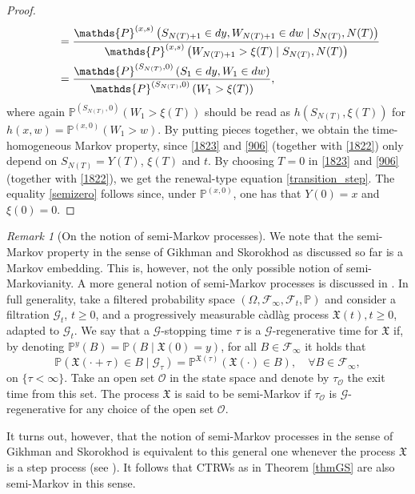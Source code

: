 \documentclass[reqno]{amsart}
\theoremstyle{remark}
\newtheorem{remark}[theorem]{Remark}
\numberwithin{equation}{section} %
\newcommand{\1}{\mathds{1}}
\begin{document}
\begin{proof}
\begin{align}
			&\qquad=\frac{\mathds{P}^{(x,s)} \left( S_{N(T)+1} \in dy, W_{N(T)+1} \in dw \mid S_{N(T)},  N(T) \right)}{\mathds{P}^{(x,s)}\left( W_{N(T)+1} > \xi(T) \mid  S_{N(T)},N(T) \right)} \notag \\
			&\qquad=\frac{\mathds{P}^{(S_{N(T)},0)} \left( S_{1} \in dy, W_{1} \in dw  \right)}{\mathds{P}^{(S_{N(T)},0)}\left( W_{1} > \xi(T) \right)},
			\label{1822}
		\end{align}
		where again $\mathds{P}^{(S_{N(T)},0)}\left( W_{1} > \xi(T) \right)$ should be read as $h(S_{N(T)},\xi(T))$ for $h(x,w)=\mathds{P}^{(x,0)}\left( W_{1} > w \right)$. By putting pieces together, we obtain the time-homogeneous Markov property, since \eqref{1823} and \eqref{906} (together with \eqref{1822}) only depend on $S_{N(T)}=Y(T)$, $\xi(T)$ and $t$. By choosing $T=0$ in \eqref{1823} and \eqref{906} (together with \eqref{1822}), we get the renewal-type equation \eqref{transition_step}. 
		The equality \eqref{semizero} follows since, under $\mathds{P}^{(x,0)}$, one has that $Y(0)=x$ and $\xi(0)=0$.
	\end{proof}
	\begin{remark}[On the notion of semi-Markov processes]
		We note that the semi-Markov property in the sense of Gikhman and Skorokhod as discussed so far is a Markov embedding. This is, however, not the only possible notion of semi-Markovianity. A more general notion of semi-Markov processes is discussed in \cite[Chapter 3]{harlamov}. In full generality, take a filtered probability space $(\Omega, \mathcal{F}_\infty, \mathcal{F}_t, \mathds{P})$ and consider a filtration $\mathcal{G}_t$, $t \geq 0$, and a progressively measurable càdlàg process $\mathfrak{X}(t), t \ge 0$, adapted to $\mathcal{G}_t$. We say that a $\mathcal{G}$-stopping time $\tau$ is a $\mathcal{G}$-regenerative time for $\mathfrak{X}$ if, by denoting $\mathds{P}^y(B)=\mathds{P}(B \mid \mathfrak{X}(0)=y)$, for all $B \in \mathcal{F}_\infty$ it holds that
		\begin{equation*}
			\mathds{P}(\mathfrak{X}(\cdot+\tau) \in B \mid \mathcal{G}_\tau)=\mathds{P}^{\mathfrak{X}(\tau)}(\mathfrak{X}(\cdot)\in B), \quad \forall B \in \mathcal{F}_\infty,
		\end{equation*}
		on $\{\tau<\infty\}$.
		Take an open set $\mathcal{O}$ in the state space and denote by $\tau_\mathcal{O}$ the exit time from this set.
		The process $\mathfrak{X}$ is said to be semi-Markov if $\tau_\mathcal{O}$ is $\mathcal{G}$-regenerative for any choice of the open set $\mathcal{O}$.
		
		It turns out, however, that the notion of semi-Markov processes in the sense of Gikhman and Skorokhod is equivalent to this general one whenever the process $\mathfrak{X}$ is a step process (see \cite[Proposition 3.4]{harlamov}). It follows that CTRWs as in Theorem \ref{thmGS} are also semi-Markov in this sense.
	\end{remark}
\end{document}

